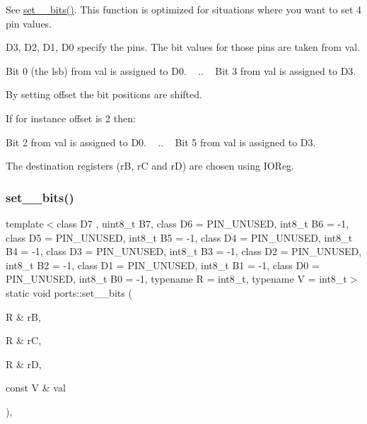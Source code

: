 See \hyperlink{namespaceports_aac15fb87d8fede3f2bf8d764ab42965f}{set\+\_\+\_\+bits()}. This function is optimized for situations where you want to set 4 pin values. 

{\ttfamily D3}, {\ttfamily D2}, {\ttfamily D1}, {\ttfamily D0} specify the pins. The bit values for those pins are taken from {\ttfamily val}.

Bit 0 (the lsb) from {\ttfamily val} is assigned to {\ttfamily D0}. ~\newline
.. ~\newline
Bit 3 from {\ttfamily val} is assigned to {\ttfamily D3}.

By setting {\ttfamily offset} the bit positions are shifted.

If for instance {\ttfamily offset} is 2 then\+:

Bit 2 from {\ttfamily val} is assigned to {\ttfamily D0}. ~\newline
.. ~\newline
Bit 5 from {\ttfamily val} is assigned to {\ttfamily D3}.

The destination registers ({\ttfamily rB}, {\ttfamily rC} and {\ttfamily rD}) are chosen using I\+O\+Reg. \hypertarget{namespaceports_aac15fb87d8fede3f2bf8d764ab42965f}{}\label{namespaceports_aac15fb87d8fede3f2bf8d764ab42965f} 
\subsubsection{\texorpdfstring{set\+\_\+\_\+bits()}{set\_8\_bits()}\hspace{0.1cm}{\footnotesize\ttfamily [1/2]}}
{\footnotesize\ttfamily template$<$class D7 , uint8\+\_\+t B7, class D6  = P\+I\+N\+\_\+\+U\+N\+U\+S\+ED, int8\+\_\+t B6 = -\/1, class D5  = P\+I\+N\+\_\+\+U\+N\+U\+S\+ED, int8\+\_\+t B5 = -\/1, class D4  = P\+I\+N\+\_\+\+U\+N\+U\+S\+ED, int8\+\_\+t B4 = -\/1, class D3  = P\+I\+N\+\_\+\+U\+N\+U\+S\+ED, int8\+\_\+t B3 = -\/1, class D2  = P\+I\+N\+\_\+\+U\+N\+U\+S\+ED, int8\+\_\+t B2 = -\/1, class D1  = P\+I\+N\+\_\+\+U\+N\+U\+S\+ED, int8\+\_\+t B1 = -\/1, class D0  = P\+I\+N\+\_\+\+U\+N\+U\+S\+ED, int8\+\_\+t B0 = -\/1, typename R  = int8\+\_\+t, typename V  = int8\+\_\+t$>$ \\
static void ports\+::set\+\_\+\_\+bits (\begin{DoxyParamCaption}\item[{R \&}]{rB,  }\item[{R \&}]{rC,  }\item[{R \&}]{rD,  }\item[{const V \&}]{val }\end{DoxyParamCaption})\hspace{0.3cm}{\ttfamily [inline]}, {\ttfamily [static]}}




